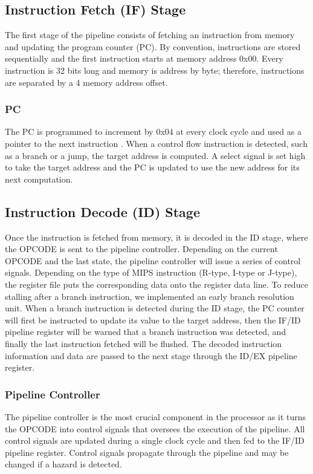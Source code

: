 \documentclass[conference]{IEEEtran}
\begin{document}
\subsection{Instruction Fetch (IF) Stage}

The first stage of the pipeline consists of fetching an instruction from memory and updating the program counter (PC). By convention, instructions are stored sequentially and the first instruction starts at memory address 0x00. Every instruction is 32 bits long and memory is address by byte; therefore, instructions are separated by a 4 memory address offset.

\subsubsection{PC} 
The PC is programmed to increment by 0x04 at every clock cycle and used as a pointer to the next instruction . When a control flow instruction is detected, such as a branch or a jump, the target address is computed. A select signal is set high to take the target address and the PC is updated to use the new address for its next computation.

\subsection{Instruction Decode (ID) Stage}

Once the instruction is fetched from memory, it is decoded in the ID stage, where the OPCODE is sent to the pipeline controller. Depending on the current OPCODE and the last state, the pipeline controller will issue a series of control signals.  Depending on the type of MIPS instruction (R-type, I-type or J-type), the register file puts the corresponding data onto the register data line. To reduce stalling after a branch instruction, we implemented an early branch resolution unit. When a branch instruction is detected during the ID stage, the PC counter will first be instructed to update its value to the target address, then the IF/ID pipeline register will be warned that a branch instruction was detected, and finally the last instruction fetched will be flushed. The decoded instruction information and data are passed to the next stage through the ID/EX pipeline register.

\subsubsection{Pipeline Controller}
The pipeline controller is the most crucial component in the processor as it turns the OPCODE into control signals that oversees the execution of the pipeline. All control signals are updated during a single clock cycle and then fed to the IF/ID pipeline register. Control signals propagate through the pipeline and may be changed if a hazard is detected. 
\end{document}
